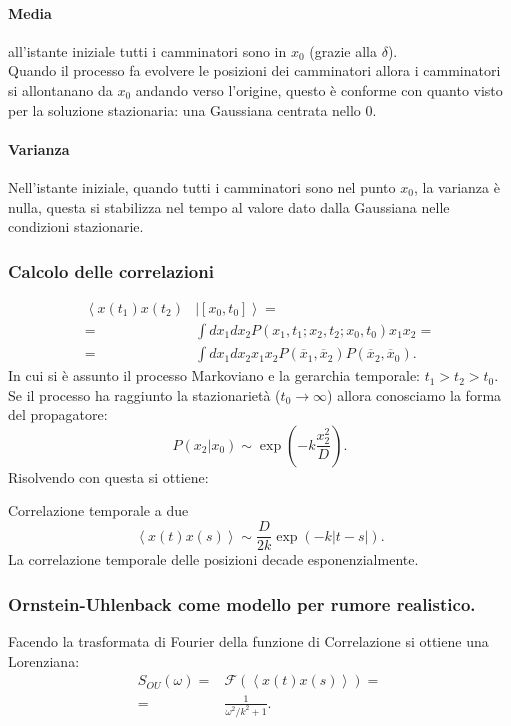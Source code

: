\paragraph{Media}%
all'istante iniziale tutti i camminatori sono in $x_0$ (grazie alla $\delta$). \\
Quando il processo fa evolvere le posizioni dei camminatori allora i camminatori si allontanano da $x_0$ andando verso l'origine, questo è conforme con quanto visto per la soluzione stazionaria: una Gaussiana centrata nello $0$.
\paragraph{Varianza}%
Nell'istante iniziale, quando tutti i camminatori sono nel punto $x_0$, la varianza è nulla, questa si stabilizza nel tempo al valore dato dalla Gaussiana nelle condizioni stazionarie.
\subsubsection{Calcolo delle correlazioni}%
\label{subsub:Calcolo delle correlazioni}
\[\begin{aligned}
    \left<x(t_1) x(t_2) \right.&\left.|\left[x_0,t_0\right]\right> =\\
    =&\int dx_1dx_2 P(x_1,t_1;x_2,t_2;x_0,t_0) x_1x_2 = \\
    =&\int dx_1dx_2 x_1x_2P(\overline{x}_1,\overline{x}_2) P(\overline{x}_2, \overline{x}_0) 
.\end{aligned}\]
In cui si è assunto il processo Markoviano e la gerarchia temporale: $t_1>t_2>t_0$.\\
Se il processo ha raggiunto la stazionarietà ($t_0\to \infty$) allora conosciamo la forma del propagatore:
\[
    P(x_2|x_0) \sim \exp\left(-k \frac{x_2^2}{D}\right)
.\] 
Risolvendo con questa si ottiene:
\begin{redbox}{Correlazione temporale a due}
    \[
	\left<x(t) x(s) \right> \sim \frac{D}{2k}\exp\left(-k\left|t-s\right|\right)
    .\] 
    La correlazione temporale delle posizioni decade esponenzialmente.
\end{redbox}
\noindent

\subsubsection{Ornstein-Uhlenback come modello per rumore realistico.}%
\label{subsub:Ornstein-Uhlenback come modello per rumore realistico.}
Facendo la trasformata di Fourier della funzione di Correlazione si ottiene una Lorenziana:
\[\begin{aligned}
    S_{OU}(\omega) = & \mathcal{F}\left(\left<x(t) x(s) \right>\right)=\\
		     =&\frac{1}{\omega^2 /k ^2 + 1}
.\end{aligned}\]

